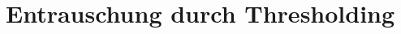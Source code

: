 \documentclass[a4paper,11pt,bibliography=totoc,listof=totoc,headinclude=true,cleardoublepage=empty,oneside]{scrbook}
\newcommand{\quellen}[1]{%
  \par\smallskip
  {\color{uhh_blue}\small\textbf{Belegstellen.}\ #1}%
  \par\medskip}
\theoremstyle{plain}
\theoremstyle{definition}
\begin{document}
\chapter{Entrauschung durch Thresholding}
\label{chapter:denoising}
 
\end{document}
